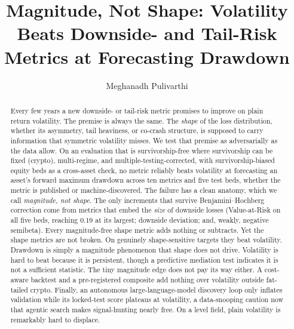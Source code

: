 \documentclass[sigconf,anonymous,nonacm]{acmart}
\begin{document}
\title{Magnitude, Not Shape: Volatility Beats Downside- and Tail-Risk
Metrics at Forecasting Drawdown}

\author{Meghanadh Pulivarthi}
\renewcommand{\shortauthors}{Pulivarthi}

\begin{abstract}
Every few years a new downside- or tail-risk metric promises to improve on
plain return volatility. The premise is always the same. The \emph{shape} of the
loss distribution, whether its asymmetry, tail heaviness, or co-crash structure, is
supposed to carry information that symmetric volatility misses. We test that premise
as adversarially as the data allow. On an evaluation that is survivorship-free where
survivorship can be fixed (crypto), multi-regime, and multiple-testing-corrected, with
survivorship-biased equity beds as a cross-asset check, no metric reliably beats
volatility at forecasting an asset's forward maximum drawdown across ten metrics and five
test beds, whether the metric is published or machine-discovered. The failure has a clean
anatomy, which we call \emph{magnitude, not shape}. The only increments that survive
Benjamini--Hochberg correction come from metrics that embed the \emph{size} of downside
losses (Value-at-Risk on all five beds, reaching $0.19$ at its largest; downside deviation;
and, weakly, negative semibeta). Every magnitude-free shape metric adds nothing or
subtracts. Yet the shape metrics
are not broken. On genuinely shape-sensitive targets they beat volatility. Drawdown
is simply a magnitude phenomenon that shape does not drive. Volatility is
hard to beat because it is persistent, though a predictive mediation test indicates it is
not a sufficient statistic. The tiny magnitude edge does not pay its way either.
A cost-aware backtest and a pre-registered composite add nothing over volatility
outside fat-tailed crypto. Finally, an autonomous large-language-model discovery
loop only inflates validation while its locked-test score plateaus at volatility, a
data-snooping caution now that agentic search makes signal-hunting nearly free.
On a level field, plain volatility is remarkably hard to displace.
\end{abstract}
\end{document}
